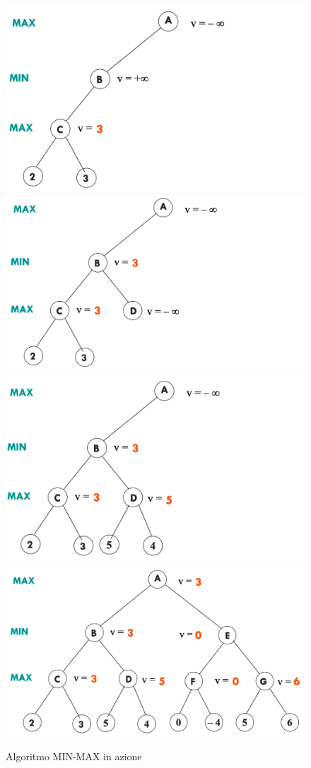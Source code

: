 \documentclass{article}
\begin{document}
\begin{figure}[H]
\includegraphics[scale=0.15]{Images/minmaxaction3.png}
\includegraphics[scale=0.15]{Images/minmaxaction4.png}
\includegraphics[scale=0.15]{Images/minmaxaction5.png}
\includegraphics[scale=0.15]{Images/minmaxaction6.png}
\caption{Algoritmo MIN-MAX in azione}
\end{figure}
\end{document}
